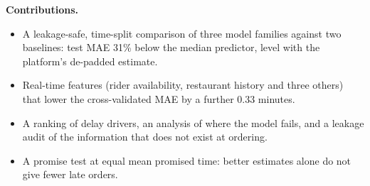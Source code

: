 \textbf{Contributions.}
\begin{itemize}
  \item A leakage-safe, time-split comparison of three model families against two baselines: test MAE
        31\% below the median predictor, level with the platform's de-padded estimate.
  \item Real-time features (rider availability, restaurant history and three others) that lower the
        cross-validated MAE by a further 0.33 minutes.
  \item A ranking of delay drivers, an analysis of where the model fails, and a leakage audit of the
        information that does not exist at ordering.
  \item A promise test at equal mean promised time: better estimates alone do not give fewer late
        orders.
\end{itemize}
